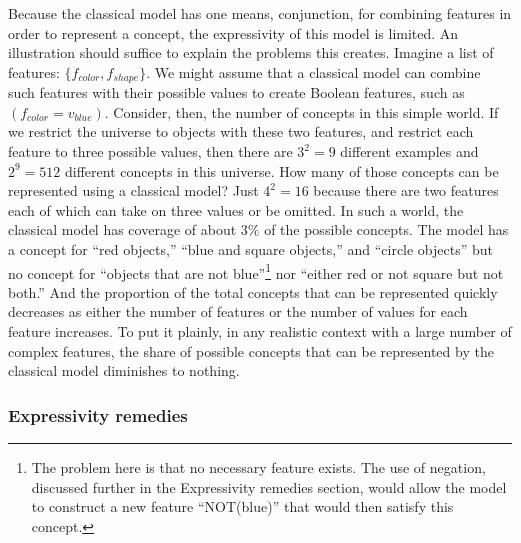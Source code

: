 \documentclass[doc,floatsintext]{apa6}
\begin{document}

Because the classical model has one means, conjunction, for combining features in order to represent a concept, the expressivity of this model is limited. An illustration should suffice to explain the problems this creates. Imagine a list of features: $\{f_{color},f_{shape}\}$. We might assume that a classical model can combine such features with their possible values to create Boolean features, such as $(f_{color}=v_{blue})$. Consider, then, the number of concepts in this simple world. If we restrict the universe to objects with these two features, and restrict each feature to three possible values, then there are $3^2 = 9$ different examples and $2^9=512$ different concepts in this universe. How many of those concepts can be represented using a classical model? Just $4^2=16$ because there are two features each of which can take on three values or be omitted. In such a world, the classical model has coverage of about $3\%$ of the possible concepts. The model has a concept for ``red objects,'' ``blue and square objects,'' and ``circle objects'' but no concept for ``objects that are not blue''\footnote{
The problem here is that no necessary feature exists. The use of negation, discussed further in the Expressivity remedies section, would allow the model to construct a new feature ``NOT(blue)'' that would then satisfy this concept.
} nor ``either red or not square but not both.''
And the proportion of the total concepts that can be represented quickly decreases as either the number of features or the number of values for each feature increases. To put it plainly, in any realistic context with a large number of complex features, the share of possible concepts that can be represented by the classical model diminishes to nothing.

\subsubsection{Expressivity remedies}
\end{document}
